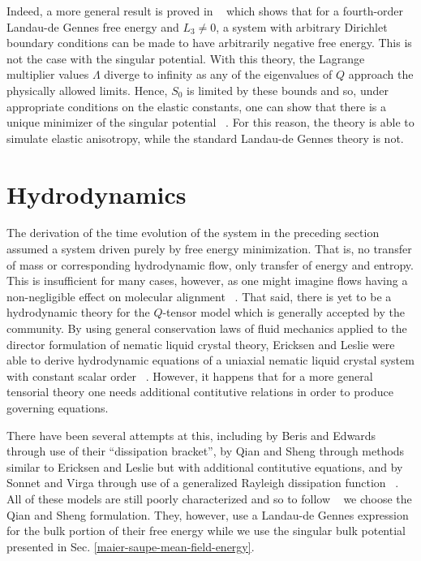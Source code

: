 \documentclass[reqno]{article}
\begin{document}
  Indeed, a more general result is proved in ~\cite{ball_nematic_2010} which
  shows that for a fourth-order Landau-de Gennes free energy and $L_3 \neq 0$, a system with
  arbitrary Dirichlet boundary conditions can be made to have arbitrarily
  negative free energy.
  This is not the case with the singular potential.
  With this theory, the Lagrange multiplier values $\Lambda$ diverge to
  infinity as any of the eigenvalues of $Q$ approach the physically allowed
  limits.
  Hence, $S_0$ is limited by these bounds and so, under appropriate conditions
  on the elastic constants, one can show that there is a unique minimizer of the
  singular potential ~\cite{schimming_numerical_2021}.
  For this reason, the theory is able to simulate elastic anisotropy, while the
  standard Landau-de Gennes theory is not.


  \section{Hydrodynamics}
  The derivation of the time evolution of the system in the preceding section
  assumed a system driven purely by free energy minimization.
  That is, no transfer of mass or corresponding hydrodynamic flow, only transfer of energy and entropy.
  This is insufficient for many cases, however, as one might imagine flows
  having a non-negligible effect on molecular alignment
  ~\cite{svensek_hydrodynamics_2002, toth_hydrodynamics_2002}.
  That said, there is yet to be a hydrodynamic theory for the $Q$-tensor model
  which is generally accepted by the community.
  By using general conservation laws of fluid mechanics applied to the director
  formulation of nematic liquid crystal theory, Ericksen and Leslie were able to
  derive hydrodynamic equations of a uniaxial nematic liquid crystal system with
  constant scalar order ~\cite{ericksen_hydrostatic_1962, Leslie1968}.
  However, it happens that for a more general tensorial theory one needs
  additional contitutive relations in order to produce governing equations.

  There have been several attempts at this, including by Beris and Edwards
  through use of their ``dissipation bracket'', by Qian and Sheng through
  methods similar to Ericksen and Leslie but with additional contitutive
  equations, and by Sonnet and Virga through use of a generalized Rayleigh
  dissipation function ~\cite{Beris1994, qian_generalized_1998, sonnet_dissipative_2012}.
  All of these models are still poorly characterized and so to follow
  ~\cite{svensek_hydrodynamics_2002} we choose the Qian and Sheng
  formulation.
  They, however, use a Landau-de Gennes expression for the bulk portion of their
  free energy while we use the singular bulk potential presented in Sec. \ref{maier-saupe-mean-field-energy}.
\end{document}
